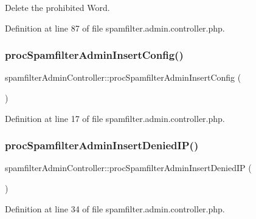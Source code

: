 Delete the prohibited Word. 



Definition at line 87 of file spamfilter.\+admin.\+controller.\+php.

\hypertarget{classspamfilterAdminController_a34c10f8c63e96895ad110241d37577fa}{}\label{classspamfilterAdminController_a34c10f8c63e96895ad110241d37577fa} 
\subsubsection{\texorpdfstring{proc\+Spamfilter\+Admin\+Insert\+Config()}{procSpamfilterAdminInsertConfig()}}
{\footnotesize\ttfamily spamfilter\+Admin\+Controller\+::proc\+Spamfilter\+Admin\+Insert\+Config (\begin{DoxyParamCaption}{ }\end{DoxyParamCaption})}



Definition at line 17 of file spamfilter.\+admin.\+controller.\+php.

\hypertarget{classspamfilterAdminController_a9f0828d5ddc3b978a7f9de739a27e8c6}{}\label{classspamfilterAdminController_a9f0828d5ddc3b978a7f9de739a27e8c6} 
\subsubsection{\texorpdfstring{proc\+Spamfilter\+Admin\+Insert\+Denied\+I\+P()}{procSpamfilterAdminInsertDeniedIP()}}
{\footnotesize\ttfamily spamfilter\+Admin\+Controller\+::proc\+Spamfilter\+Admin\+Insert\+Denied\+IP (\begin{DoxyParamCaption}{ }\end{DoxyParamCaption})}



Definition at line 34 of file spamfilter.\+admin.\+controller.\+php.

\hypertarget{classspamfilterAdminController_a8cc8354d502de92a6413aec6be3c0376}{}\label{classspamfilterAdminController_a8cc8354d502de92a6413aec6be3c0376} 
